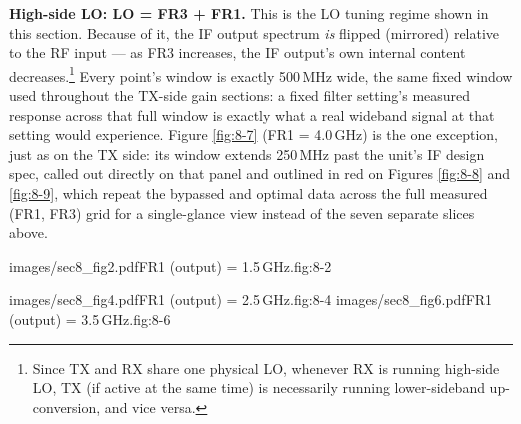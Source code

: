 \textbf{High-side LO: LO = FR3 + FR1.} This is the LO tuning regime shown in this section. Because of it,
the IF output spectrum \emph{is} flipped (mirrored) relative to the RF input --- as FR3 increases, the IF
output's own internal content decreases.\footnote{Since TX and RX share one physical LO, whenever RX is
running high-side LO, TX (if active at the same time) is necessarily running lower-sideband up-conversion, and
vice versa.} Every point's window is exactly 500\,MHz wide, the same fixed window used throughout the TX-side
gain sections: a fixed filter setting's measured response across that full window is exactly what a real
wideband signal at that setting would experience. Figure \ref{fig:8-7} (FR1 = 4.0\,GHz) is the one exception,
just as on the TX side: its window extends 250\,MHz past the unit's IF design spec, called out directly on
that panel and outlined in red on Figures \ref{fig:8-8} and \ref{fig:8-9}, which repeat the bypassed and
optimal data across the full measured (FR1, FR3) grid for a single-glance view instead of the seven separate
slices above.

%
        {images/sec8_fig2.pdf}{FR1 (output) = 1.5\,GHz.}{fig:8-2}

%
        {images/sec8_fig4.pdf}{FR1 (output) = 2.5\,GHz.}{fig:8-4}
%
        {images/sec8_fig6.pdf}{FR1 (output) = 3.5\,GHz.}{fig:8-6}

\newpage
{}
